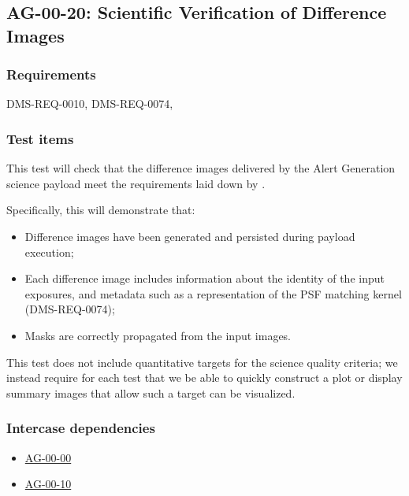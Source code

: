 \subsection{AG-00-20: Scientific Verification of Difference Images}
\label{ag-00-20}

\subsubsection{Requirements}

DMS-REQ-0010, DMS-REQ-0074, 

\subsubsection{Test items}
\label{ag-00-20-items}

This test will check that the difference images delivered by the
Alert Generation science payload meet the requirements laid down by .

Specifically, this will demonstrate that:

\begin{itemize}

  \item{Difference images have been generated and persisted during
  payload execution;}
  \item{Each difference image includes information about the identity of
	the input exposures, and metadata such as a representation of the
		PSF matching kernel (DMS-REQ-0074);}
  \item{Masks are correctly propagated from the input images.}

\end{itemize}

This test does not include quantitative targets for the science quality criteria; we instead require for each test that we be able to quickly construct a plot or display summary images that allow such a target can be visualized.

\subsubsection{Intercase dependencies}

\begin{itemize}

  \item{\hyperref[ag-00-00]{AG-00-00}}
  \item{\hyperref[ag-00-10]{AG-00-10}}

\end{itemize}

